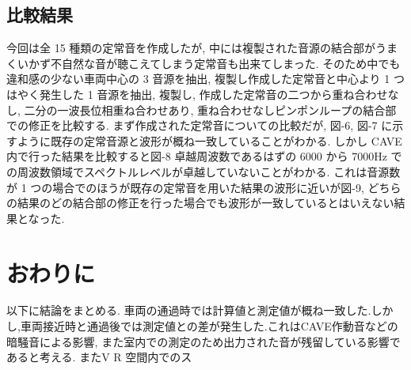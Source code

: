 \documentclass[10pt]{jsarticle}
\begin{document}

\subsection{比較結果}
今回は全 15 種類の定常音を作成したが, 中には複製された音源の結合部がうまくいかず不自然な音が聴こえてしまう定常音も出来てしまった. そのため中でも違和感の少ない車両中心の 3 音源を抽出, 複製し作成した定常音と中心より 1 つはやく発生した 1 音源を抽出, 複製し, 作成した定常音の二つから重ね合わせなし, 二分の一波長位相重ね合わせあり, 重ね合わせなしピンポンループの結合部での修正を比較する. まず作成された定常音についての比較だが, 図-6, 図-7 に示すように既存の定常音源と波形が概ね一致していることがわかる. しかし CAVE 内で行った結果を比較すると図-8 卓越周波数であるはずの 6000 から 7000Hz での周波数領域でスペクトルレベルが卓越していないことがわかる. これは音源数が 1 つの場合でのほうが既存の定常音を用いた結果の波形に近いが図-9, どちらの結果のどの結合部の修正を行った場合でも波形が一致しているとはいえない結果となった.


\section{おわりに}
以下に結論をまとめる. 車両の通過時では計算値と測定値が概ね一致した.しかし,車両接近時と通過後では測定値との差が発生した.これはCAVE作動音などの暗騒音による影響, また室内での測定のため出力された音が残留している影響であると考える. またV R 空間内でのス
\end{document}
